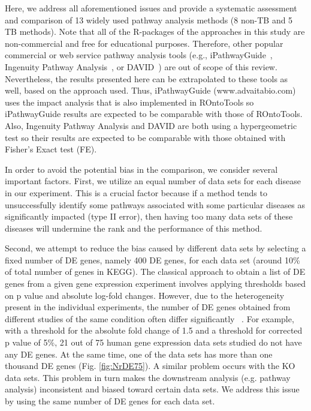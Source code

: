\documentclass[Minh_PhD_thesis.tex]{subfiles}
\begin{document}
Here, we address all aforementioned issues and provide a systematic assessment and comparison of 13 widely used pathway analysis methods (8 non-TB and 5 TB methods). 
Note that all of the R-packages of the approaches in this study are non-commercial and free for educational purposes. 
Therefore, other popular commercial or web service pathway analysis tools (e.g., iPathwayGuide~\cite{ahsan2017identifying}, Ingenuity Pathway Analysis~\cite{kramer2013causal}, or DAVID~\cite{huang2008systematic}) are out of scope of this review. Nevertheless, the results presented here can be extrapolated to these tools as well, based on the approach used. Thus, iPathwayGuide (www.advaitabio.com) uses the impact analysis that is also implemented in ROntoTools so iPathwayGuide results are expected to be comparable with those of ROntoTools. Also, Ingenuity Pathway Analysis and DAVID are both using a hypergeometric test so their results are expected to be comparable with those obtained with Fisher's Exact test (FE).
 
In order to avoid the potential bias in the comparison, we consider several important factors. 
First, we utilize an equal number of data sets for each disease in our experiment.
This is a crucial factor because if a method tends to unsuccessfully identify some pathways associated with some particular diseases as significantly impacted (type II error), then having too many data sets of these diseases will undermine the rank and the performance of this method.

Second, we attempt to reduce the bias caused by different data sets by selecting a fixed number of DE genes, namely 400 DE genes, for each data set (around 10\% of total number of genes in KEGG).
The classical approach to obtain a list of DE genes from a given gene expression experiment involves applying thresholds based on p value and absolute log-fold changes.
However, due to the heterogeneity present in the individual experiments, the number of DE genes obtained from different studies of the same condition often differ significantly ~\cite{Draghici:2006, tan2003evaluation, ein2005outcome}.
For example, with a threshold for the absolute fold change of 1.5 and a threshold  for corrected p value of 5\%, 21 out of 75 human gene expression data sets studied do not have any DE genes. At the same time,  one of the data sets has more than one thousand DE genes (Fig. \ref{fig:NrDE75}). 
A similar problem occurs with the KO data sets. %
This problem in turn makes the downstream analysis (e.g. pathway analysis) inconsistent and biased toward certain data sets. We address this issue by using the same number of DE genes for each data set.
\end{document}
